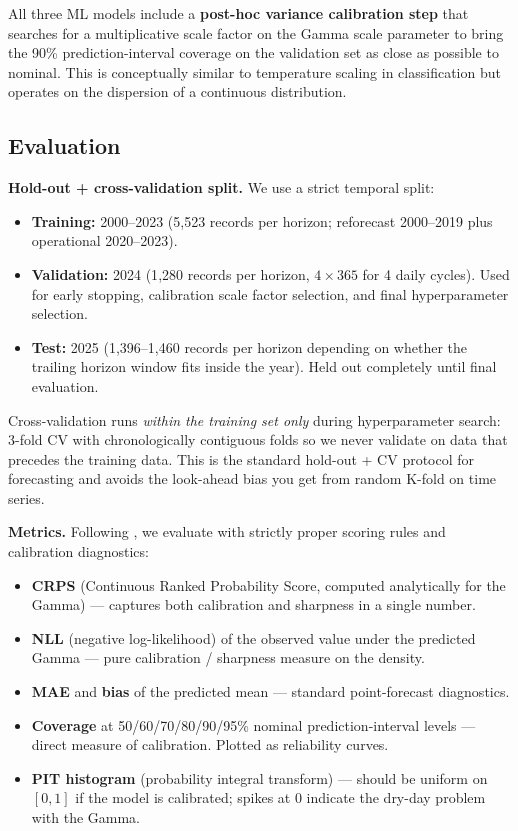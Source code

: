 \documentclass[11pt]{article}
\begin{document}
All three ML models include a \textbf{post-hoc variance calibration step} that searches for a multiplicative scale factor on the Gamma scale parameter to bring the 90\% prediction-interval coverage on the validation set as close as possible to nominal. This is conceptually similar to temperature scaling in classification but operates on the dispersion of a continuous distribution.

\subsection{Evaluation}

\textbf{Hold-out + cross-validation split.} We use a strict temporal split:
\begin{itemize}[leftmargin=1.5em]
    \item \textbf{Training:} 2000--2023 (5{,}523 records per horizon; reforecast 2000--2019 plus operational 2020--2023).
    \item \textbf{Validation:} 2024 (1{,}280 records per horizon, $4 \times 365$ for 4 daily cycles). Used for early stopping, calibration scale factor selection, and final hyperparameter selection.
    \item \textbf{Test:} 2025 (1{,}396--1{,}460 records per horizon depending on whether the trailing horizon window fits inside the year). Held out completely until final evaluation.
\end{itemize}

Cross-validation runs \emph{within the training set only} during hyperparameter search: 3-fold CV with chronologically contiguous folds so we never validate on data that precedes the training data. This is the standard hold-out + CV protocol for forecasting and avoids the look-ahead bias you get from random K-fold on time series.

\textbf{Metrics.} Following \citet{gneiting2007strictly}, we evaluate with strictly proper scoring rules and calibration diagnostics:
\begin{itemize}[leftmargin=1.5em]
    \item \textbf{CRPS} (Continuous Ranked Probability Score, computed analytically for the Gamma) --- captures both calibration and sharpness in a single number.
    \item \textbf{NLL} (negative log-likelihood) of the observed value under the predicted Gamma --- pure calibration / sharpness measure on the density.
    \item \textbf{MAE} and \textbf{bias} of the predicted mean --- standard point-forecast diagnostics.
    \item \textbf{Coverage} at 50/60/70/80/90/95\% nominal prediction-interval levels --- direct measure of calibration. Plotted as reliability curves.
    \item \textbf{PIT histogram} (probability integral transform) --- should be uniform on $[0,1]$ if the model is calibrated; spikes at 0 indicate the dry-day problem with the Gamma.
\end{itemize}
\end{document}
